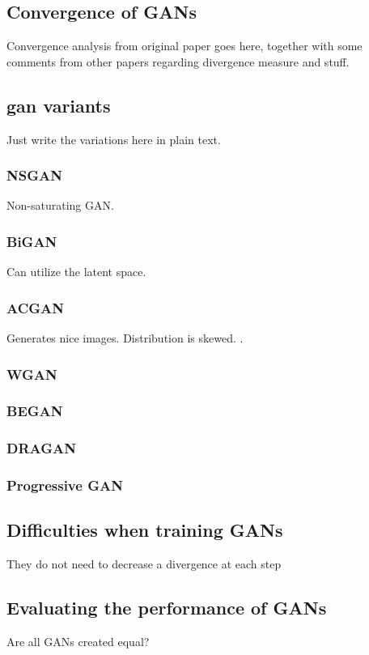 \subsection{Convergence of GANs}
Convergence analysis from original paper goes here, together with some comments from other papers regarding divergence measure and stuff.

\subsection{\acrshort{gan} variants}
Just write the variations here in plain text.
\subsubsection{NSGAN} Non-saturating GAN.
\subsubsection{BiGAN}
Can utilize the latent space.
\subsubsection{ACGAN}
Generates nice images. \textcite{odena2016conditional} Distribution is skewed. \textcite{shuac2017acganisbad}.
\subsubsection{WGAN}
\subsubsection{BEGAN}
\subsubsection{DRAGAN}
\subsubsection{Progressive GAN}

\subsection{Difficulties when training GANs}
They do not need to decrease a divergence at each step \textcite{fedus2017many}

\subsection{Evaluating the performance of GANs}
Are all GANs created equal? \textcite{lucic2017gans}

